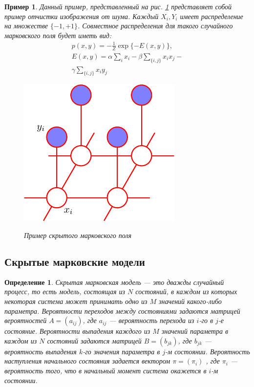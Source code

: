 \documentclass[12pt]{article}
\newtheorem{dfn}{Определение}
\newtheorem{example}{Пример}
\begin{document}
\begin{example}
Данный пример, представленный на рис. \ref{fig:hmrf:ex} представляет собой пример отчистки изображения от шума. Каждый $X_i, Y_i$ имеет распределение на множестве $\{-1, +1\}$.
Совместное распределения для такого случайного марковского поля будет иметь вид:
\begin{gather*}
p(x, y) = -\frac{1}{Z} \exp\{ -E(x, y)\}, \\ 
E(x, y) = \alpha \sum\limits_i x_i - \beta \sum\limits_{ \{i, j \} } x_i x_j -   \\ \gamma \sum\limits_{ \{i, j \} } x_i y_j
\end{gather*}
\begin{figure}[hhh]
\centering
\includegraphics[width=.5\linewidth]{./figures/image.pdf}
\label{fig:hmrf:ex}
\caption{Пример скрытого марковского поля}
\end{figure}
\end{example}

\newpage
\subsection{Скрытые марковские модели}
\begin{dfn}
Скрытая марковская модель --- это дважды случайный процесс, то есть модель, состоящая из $N$ состояний,
в каждом из которых некоторая система может принимать одно из
$M$ значений какого-либо параметра. Вероятности переходов между
состояниями задаются матрицей вероятностей $A = (a_{ij})$, где $a_{ij}$ — вероятность перехода из $i$-го в $j$-е состояние. Вероятности выпадения каждого из $M$ значений параметра в каждом из $N$ состояний
задаются матрицей $B = (b_{jk})$, где $b_{jk}$ — вероятность выпадения $k$-го
значения параметра в $j$-м состоянии. Вероятность наступления начального состояния задается вектором $\pi = (\pi_i)$ , где $\pi_i$ --- вероятность
того, что в начальный момент система окажется в $i$-м состоянии.
\end{dfn}
\end{document}
